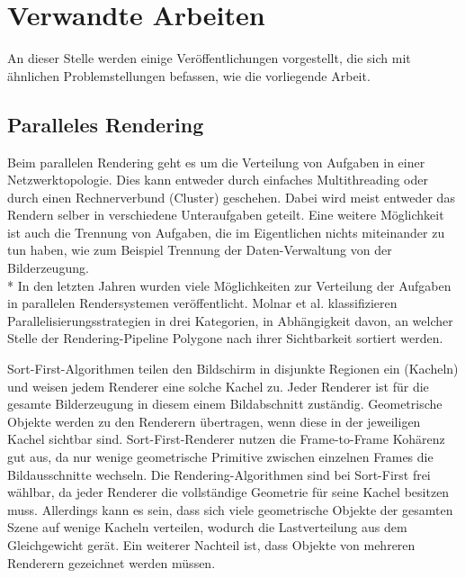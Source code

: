 \chapter{Verwandte Arbeiten}
\label{chap:relwork}
%
An dieser Stelle werden einige Veröffentlichungen vorgestellt, die sich mit ähnlichen Problemstellungen befassen, wie die vorliegende Arbeit.
%
\section{Paralleles Rendering}
\label{sec:relwork:parrender}
Beim parallelen Rendering geht es um die Verteilung von Aufgaben in einer Netzwerktopologie. Dies kann entweder durch einfaches Multithreading oder durch einen Rechnerverbund (Cluster) geschehen. Dabei wird meist entweder das Rendern selber in verschiedene Unteraufgaben geteilt. Eine weitere Möglichkeit ist auch die Trennung von Aufgaben, die im Eigentlichen nichts miteinander zu tun haben, wie zum Beispiel Trennung der Daten-Verwaltung von der Bilderzeugung.\\*
In den letzten Jahren wurden viele Möglichkeiten zur Verteilung der Aufgaben in parallelen Rendersystemen veröffentlicht. Molnar et al. \cite{molnar} klassifizieren Parallelisierungsstrategien in drei Kategorien, in Abhängigkeit davon, an welcher Stelle der Rendering-Pipeline Polygone nach ihrer Sichtbarkeit sortiert werden.

Sort-First-Algorithmen teilen den Bildschirm in disjunkte Regionen ein (Kacheln) und weisen jedem Renderer eine solche Kachel zu. Jeder Renderer ist für die gesamte Bilderzeugung in diesem einem Bildabschnitt zuständig. Geometrische Objekte werden zu den Renderern übertragen, wenn diese in der jeweiligen Kachel sichtbar sind. Sort-First-Renderer nutzen die Frame-to-Frame Kohärenz gut aus, da nur wenige geometrische Primitive zwischen einzelnen Frames die Bildausschnitte wechseln. Die Rendering-Algorithmen sind bei Sort-First frei wählbar, da jeder Renderer die vollständige Geometrie für seine Kachel besitzen muss. Allerdings kann es sein, dass sich viele geometrische Objekte der gesamten Szene auf wenige Kacheln verteilen, wodurch die Lastverteilung aus dem Gleichgewicht gerät. Ein weiterer Nachteil ist, dass Objekte von mehreren Renderern gezeichnet werden müssen.


